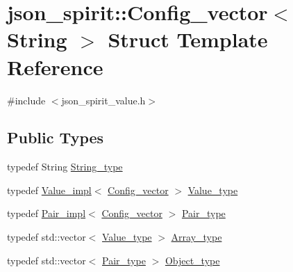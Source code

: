 \hypertarget{structjson__spirit_1_1_config__vector}{}\section{json\+\_\+spirit\+:\+:Config\+\_\+vector$<$ String $>$ Struct Template Reference}
\label{structjson__spirit_1_1_config__vector}


{\ttfamily \#include $<$json\+\_\+spirit\+\_\+value.\+h$>$}

\subsection*{Public Types}
\begin{DoxyCompactItemize}
\item 
typedef String \hyperlink{structjson__spirit_1_1_config__vector_a9f0a96da6042290c5bc25c1b3269e747}{String\+\_\+type}
\item 
typedef \hyperlink{classjson__spirit_1_1_value__impl}{Value\+\_\+impl}$<$ \hyperlink{structjson__spirit_1_1_config__vector}{Config\+\_\+vector} $>$ \hyperlink{structjson__spirit_1_1_config__vector_aa06382368ae0d04aa77534d6f73592c8}{Value\+\_\+type}
\item 
typedef \hyperlink{structjson__spirit_1_1_pair__impl}{Pair\+\_\+impl}$<$ \hyperlink{structjson__spirit_1_1_config__vector}{Config\+\_\+vector} $>$ \hyperlink{structjson__spirit_1_1_config__vector_ae65b82636d991e02baba4eb5ddfbd0d1}{Pair\+\_\+type}
\item 
typedef std\+::vector$<$ \hyperlink{structjson__spirit_1_1_config__vector_aa06382368ae0d04aa77534d6f73592c8}{Value\+\_\+type} $>$ \hyperlink{structjson__spirit_1_1_config__vector_af33059c26ec27a5153b53dd4bd312815}{Array\+\_\+type}
\item 
typedef std\+::vector$<$ \hyperlink{structjson__spirit_1_1_config__vector_ae65b82636d991e02baba4eb5ddfbd0d1}{Pair\+\_\+type} $>$ \hyperlink{structjson__spirit_1_1_config__vector_a070c3d1a0aea6da7c24a60400d52f15d}{Object\+\_\+type}
\end{DoxyCompactItemize}

